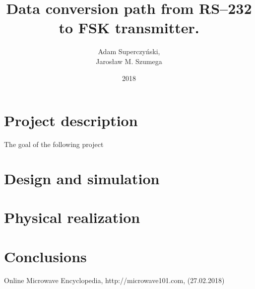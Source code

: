 \documentclass[eng,printmode, openany]{mgr}
\author{Adam Superczyński,\\Jarosław M. Szumega}
\title{Data conversion path from RS--232 to FSK transmitter. }
\date{2018}
\begin{document}
	\maketitle
	\tableofcontents
\chapter{Project description}
The goal of the following project
\chapter{Design and simulation}
\chapter{Physical realization}
\chapter{Conclusions}

\begin{thebibliography}{9}
 Online Microwave Encyclopedia, http://microwave101.com,  (27.02.2018)
\end{thebibliography}
	
\end{document}
